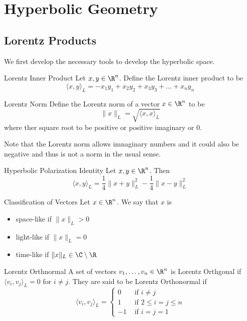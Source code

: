 \pagebreak
\section{Hyperbolic Geometry}
\subsection{Lorentz Products}
We first develop the necessary tools to develop the hyperbolic space. 
\begin{defn}{Lorentz Inner Product}{} Let $x,y\in\R^n$. Define the Lorentz inner product to be $$\langle x,y\rangle_L=-x_1y_1+x_2y_2+x_3y_3+\dots+x_ny_n$$
\end{defn}

\begin{defn}{Lorentz Norm}{} Define the Lorentz norm of a vector $x\in\R^n$ to be $$\|x\|_L=\sqrt{\langle x,x\rangle_L}$$ where ther square root to be positive or positive imaginary or $0$. 
\end{defn}

Note that the Lorentz norm allows imnaginary numbers and it could also be negative and thus is not a norm in the usual sense. 

\begin{prp}{Hyperbolic Polarization Identity}{} Let $x,y\in\R^n$. Then $$\langle x,y\rangle_L=\frac{1}{4}\|x+y\|_L^2-\frac{1}{4}\|x-y\|_L^2$$
\end{prp}

\begin{defn}{Classification of Vectors}{} Let $x\in\R^n$. We say that $x$ is 
\begin{itemize}
\item space-like if $\|x\|_L>0$
\item light-like if $\|x\|_L=0$
\item time-like if $\|x\|_L\in\C\setminus\R$
\end{itemize}
\end{defn}

\begin{defn}{Lorentz Orthnormal}{} A set of vectors $v_1,\dots,v_n\in\R^n$ is Lorentz Orthgonal if $\langle v_i,v_j\rangle_L=0$ for $i\neq j$. They are said to be Lorentz Orthonormal if $$\langle v_i,v_j\rangle_L=\begin{cases}
0 & \text{ if }i\neq j\\
1 & \text{ if }2\leq i=j\leq n\\
-1 & \text{ if }i=j=1
\end{cases}$$
\end{defn}

